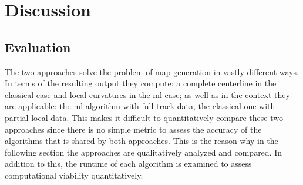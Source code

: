 \graphicspath{{Chapter/Figs/evaluation/}}
\chapter{Discussion}

\section{Evaluation}
The two approaches solve the problem of map generation in vastly different ways. In terms of the resulting output they compute: a complete centerline in the classical case and local curvatures in the \ac{ml} case; as well as in the context they are applicable: the \ac{ml} algorithm with full track data, the classical one with partial local data. This makes it difficult to quantitatively compare these two approaches since there is no simple metric to assess the accuracy of the algorithms that is shared by both approaches. This is the reason why in the following section the approaches are qualitatively analyzed and compared. In addition to this, the runtime of each algorithm is examined to assess computational viability quantitatively.

